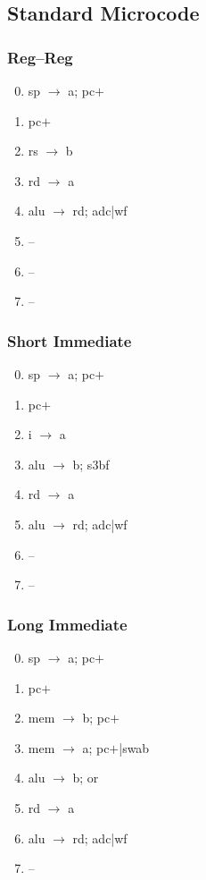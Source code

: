\documentclass[11pt]{book}
\begin{document}
\subsection*{Standard Microcode}
\begin{multicols}{3}\ttfamily\selectfont\small
  \subsubsection*{Reg--Reg}
  \begin{enumerate}\setcounter{enumi}{-1}
  \item sp \(\rightarrow\) a; pc\(+\)
  \item pc\(+\)
  \item rs \(\rightarrow\) b
  \item rd \(\rightarrow\) a
  \item alu \(\rightarrow\) rd; adc|wf
  \item --
  \item --
  \item --
  \end{enumerate}
  \columnbreak
  \subsubsection*{Short Immediate}
  \begin{enumerate}\setcounter{enumi}{-1}
  \item sp \(\rightarrow\) a; pc\(+\)
  \item pc\(+\)
  \item i \(\rightarrow\) a
  \item alu \(\rightarrow\) b; s3bf
  \item rd \(\rightarrow\) a
  \item alu \(\rightarrow\) rd; adc|wf
  \item --
  \item --
  \end{enumerate}
  \columnbreak
  \subsubsection*{Long Immediate}
  \begin{enumerate}\setcounter{enumi}{-1}
  \item sp \(\rightarrow\) a; pc\(+\)
  \item pc\(+\)
  \item mem \(\rightarrow\) b; pc\(+\)
  \item mem \(\rightarrow\) a; pc\(+\)|swab
  \item alu \(\rightarrow\) b; or
  \item rd \(\rightarrow\) a
  \item alu \(\rightarrow\) rd; adc|wf
  \item --
  \end{enumerate}
\end{multicols}
\end{document}
